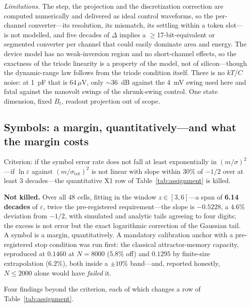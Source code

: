 \documentclass[11pt]{article}
\begin{document}
\textit{Limitations.} The step, the projection and the discretization correction are computed numerically and delivered as ideal control waveforms, so the per-channel converter---its resolution, its mismatch, its settling within a token slot---is not modelled, and five decades of $\Delta$ implies a $\ge$17-bit-equivalent or segmented converter per channel that could easily dominate area and energy. The device model has no weak-inversion region and no short-channel effects, so the exactness of the triode linearity is a property of the model, not of silicon---though the dynamic-range law follows from the triode condition itself. There is no $kT/C$ noise: at 1~pF that is $64\,\mu$V, only ${\sim}36$~dB against the 4~mV swing used here and fatal against the nanovolt swings of the shrunk-swing control. One state dimension, fixed $B_t$, readout projection out of scope.

\subsection{Symbols: a margin, quantitatively---and what the margin costs}
\label{sec:symbol}

Criterion: if the symbol error rate does not fall at least exponentially in $(m/\sigma)^2$---if $\ln\varepsilon$ against $(m/\sigma_{\mathrm{tot}})^2$ is not linear with slope within $30\%$ of $-1/2$ over at least 3 decades---the quantitative X1 row of Table~\ref{tab:assignment} is killed.

\textbf{Not killed.} Over all 48 cells, fitting in the window $z\in[3,6]$---a span of \textbf{6.14 decades} of $\varepsilon$, twice the pre-registered requirement---the slope is $\mathbf{-0.5228}$, a $4.6\%$ deviation from $-1/2$, with simulated and analytic tails agreeing to four digits; the excess is not error but the exact logarithmic correction of the Gaussian tail. A symbol is a margin, quantitatively. A mandatory calibration anchor with a pre-registered stop condition was run first: the classical attractor-memory capacity, reproduced at $0.1460$ at $N = 8000$ ($5.8\%$ off) and $0.1295$ by finite-size extrapolation ($6.2\%$), both inside a $\pm10\%$ band---and, reported honestly, $N\le2000$ alone would have \textit{failed} it.

Four findings beyond the criterion, each of which changes a row of Table~\ref{tab:assignment}.
\end{document}
